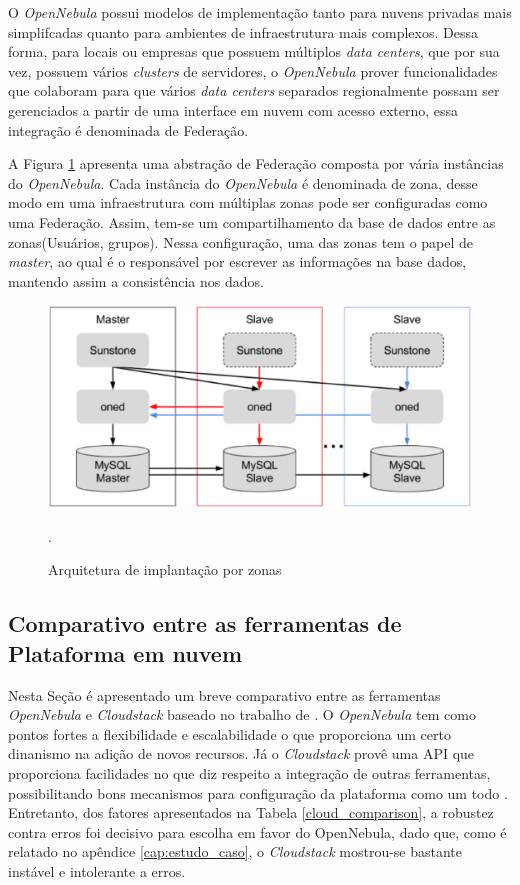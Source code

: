 O \textit{OpenNebula} possui modelos de implementação tanto para nuvens privadas mais simplifcadas quanto para ambientes de infraestrutura mais complexos. Dessa forma, para locais ou empresas que possuem múltiplos \textit{data centers}, que por sua vez, possuem vários \textit{clusters} de servidores, o \textit{OpenNebula} prover funcionalidades que colaboram para que vários \textit{data centers} separados regionalmente possam ser gerenciados a partir de uma interface em nuvem com acesso externo, essa integração é denominada de Federação. 

 A Figura \ref{opennebulafederation} apresenta uma abstração de Federação composta por vária instâncias do \textit{OpenNebula}. Cada instância do \textit{OpenNebula} é denominada de zona, desse modo em uma infraestrutura com múltiplas zonas pode ser configuradas como uma Federação. Assim, tem-se um compartilhamento da base de dados entre as zonas(Usuários, grupos). Nessa configuração, uma das zonas tem o papel de \textit{master}, ao qual é o responsável por escrever as informações na base dados, mantendo assim a consistência nos dados\cite{opennebula}.

\begin{figure}[!htb]
\centering
\includegraphics [keepaspectratio=true,scale=0.50]{figuras/opennebula_zone.eps}
\caption{Arquitetura de implantação por zonas}
\cite{opennebula}.
\label{opennebulafederation}
\end{figure}

\subsection{Comparativo entre as ferramentas de Plataforma em nuvem}

Nesta Seção é apresentado um breve comparativo entre as ferramentas \textit{OpenNebula} e \textit{Cloudstack} baseado no trabalho de . O \textit{OpenNebula} tem como pontos fortes a flexibilidade e escalabilidade o que proporciona um certo dinanismo na adição de novos recursos. Já o \textit{Cloudstack} provê uma API que proporciona facilidades no que diz respeito a integração de outras ferramentas, possibilitando bons mecanismos para configuração da plataforma como um todo \cite{salam}. Entretanto, dos fatores apresentados na Tabela \ref{cloud_comparison}, a robustez contra erros foi decisivo para escolha em favor do OpenNebula, dado que, como é relatado no apêndice \ref{cap:estudo_caso}, o \textit{Cloudstack} mostrou-se bastante instável e intolerante a erros.

